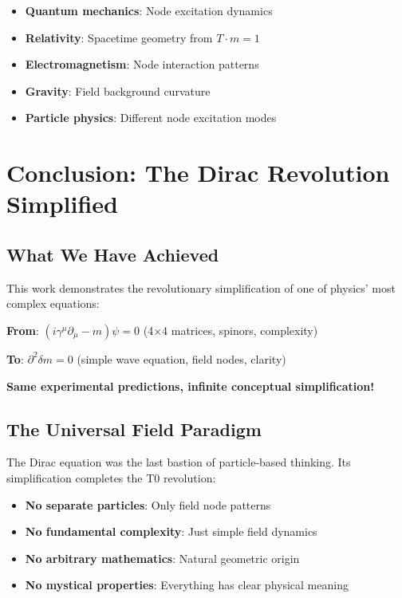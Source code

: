 \documentclass[12pt,a4paper]{article}
\newcommand{\deltam}{\delta m}
\theoremstyle{definition}
\theoremstyle{remark}
\begin{document}
	\begin{itemize}
		\item \textbf{Quantum mechanics}: Node excitation dynamics
		\item \textbf{Relativity}: Spacetime geometry from $T \cdot m = 1$
		\item \textbf{Electromagnetism}: Node interaction patterns
		\item \textbf{Gravity}: Field background curvature
		\item \textbf{Particle physics}: Different node excitation modes
	\end{itemize}
	
	\section{Conclusion: The Dirac Revolution Simplified}
	
	\subsection{What We Have Achieved}
	
	This work demonstrates the revolutionary simplification of one of physics' most complex equations:
	
	\begin{center}
		\textbf{From}: $(i\gamma^{\mu}\partial_{\mu} - m)\psi = 0$ (4×4 matrices, spinors, complexity)
		
		\textbf{To}: $\partial^2 \deltam = 0$ (simple wave equation, field nodes, clarity)
	\end{center}
	
	\textbf{Same experimental predictions, infinite conceptual simplification!}
	
	\subsection{The Universal Field Paradigm}
	
	The Dirac equation was the last bastion of particle-based thinking. Its simplification completes the T0 revolution:
	
	\begin{itemize}
		\item \textbf{No separate particles}: Only field node patterns
		\item \textbf{No fundamental complexity}: Just simple field dynamics
		\item \textbf{No arbitrary mathematics}: Natural geometric origin
		\item \textbf{No mystical properties}: Everything has clear physical meaning
	\end{itemize}
	
\end{document}
